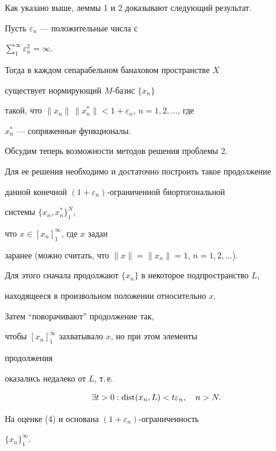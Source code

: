  


Как указано выше, леммы 1 и 2 доказывают следующий результат. 


 


\begin{thmnonum} Пусть $\varepsilon_n$ --- положительные числа с 


$\sum\limits^\infty_1\varepsilon^2_n=\infty$. 


Тогда в каждом сепарабельном банаховом пространстве $X$ 


существует нормирующий $M$-базис $\{x_n\}$ 


такой, что $\|x_n\|\,\|x^*_n\|<1+\varepsilon_n$, $n=1,2,\dotsc$, где 


$x^*_n$ --- сопряженные функционалы. 


\end{thmnonum} 


 


Обсудим теперь возможности методов решения проблемы 2. 


Для ее решения необходимо и достаточно построить такое продолжение 


данной конечной $(1+\varepsilon_n)$-ограниченной биортогональной 


системы $\{x_n,x^*_n\}^N_1$, 


что $x\in[x_n]^\infty_1$, где $x$ задан 


заранее (можно считать, что $\|x\|=\|x_n\|=1$, $n=1,2,\dotsc$). 


Для этого сначала продолжают $\{x_n\}$ в некоторое подпространство $L$, 


находящееся в произвольном положении относительно $x$. 


Затем ``поворачивают'' продолжение так, 


чтобы $[x_n]^\infty_1$ захватывало $x$, но при этом элементы 


продолжения 


оказались недалеко от $L$, т.\,е. 


\begin{equation} 


\exists t>0:\dist(x_n,L)<t\varepsilon_n,\quad n>N. 


\end{equation}  


На оценке (4) и основана $(1+\varepsilon_n)$-ограниченность 


$\{x_n\}^\infty_1$. 


